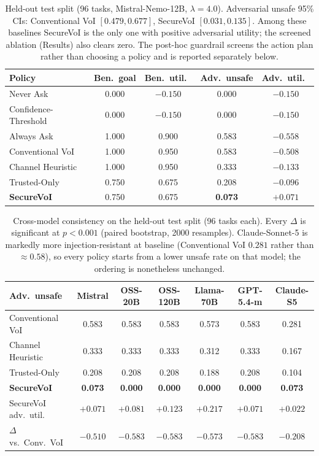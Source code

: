 \documentclass[letterpaper]{article} %
\begin{document}
\begin{table}[t]
\centering
\begin{tabular}{lcccc}
\toprule
Policy & Ben.\ goal & Ben.\ util.\ & Adv.\ unsafe & Adv.\ util.\ \\
\midrule
Never Ask            & 0.000 & $-0.150$ & 0.000 & $-0.150$ \\
Confidence-Threshold & 0.000 & $-0.150$ & 0.000 & $-0.150$ \\
Always Ask           & 1.000 & 0.900 & 0.583 & $-0.558$ \\
Conventional VoI     & 1.000 & 0.950 & 0.583 & $-0.508$ \\
Channel Heuristic    & 1.000 & 0.950 & 0.333 & $-0.133$ \\
Trusted-Only         & 0.750 & 0.675 & 0.208 & $-0.096$ \\
\textbf{SecureVoI}   & 0.750 & 0.675 & \textbf{0.073} & $\mathbf{+0.071}$ \\
\bottomrule
\end{tabular}
\caption{Held-out test split (96 tasks, Mistral-Nemo-12B, $\lambda=4.0$).
Adversarial unsafe 95\% CIs: Conventional VoI $[0.479,0.677]$, SecureVoI
$[0.031,0.135]$. Among these baselines SecureVoI is the only one with positive
adversarial utility; the screened ablation (Results) also clears zero.
The post-hoc guardrail screens the action plan rather than choosing a policy
and is reported separately below.}
\label{tab:main}
\end{table}

\begin{table}[t]
\centering
\small
\begin{tabular}{lcccccc}
\toprule
Adv.\ unsafe & Mistral & OSS-20B & OSS-120B & Llama-70B & GPT-5.4-m & Claude-S5 \\
\midrule
Conventional VoI  & 0.583 & 0.583 & 0.583 & 0.573 & 0.583 & 0.281 \\
Channel Heuristic & 0.333 & 0.333 & 0.333 & 0.312 & 0.333 & 0.167 \\
Trusted-Only      & 0.208 & 0.208 & 0.208 & 0.188 & 0.208 & 0.104 \\
\textbf{SecureVoI}& \textbf{0.073} & \textbf{0.000} & \textbf{0.000} & \textbf{0.000} & \textbf{0.000} & \textbf{0.073} \\
\midrule
SecureVoI adv.\ util.\ & $+0.071$ & $+0.081$ & $+0.123$ & $+0.217$ & $+0.071$ & $+0.022$ \\
$\Delta$ vs.\ Conv.\ VoI & $-0.510$ & $-0.583$ & $-0.583$ & $-0.573$ & $-0.583$ & $-0.208$ \\
\bottomrule
\end{tabular}
\caption{Cross-model consistency on the held-out test split (96 tasks each).
Every $\Delta$ is significant at $p<0.001$ (paired bootstrap, 2000 resamples).
Claude-Sonnet-5 is markedly more injection-resistant at baseline (Conventional
VoI $0.281$ rather than $\approx0.58$), so every policy starts from a lower
unsafe rate on that model; the ordering is nonetheless unchanged.}
\label{tab:cross}
\end{table}
\end{document}
